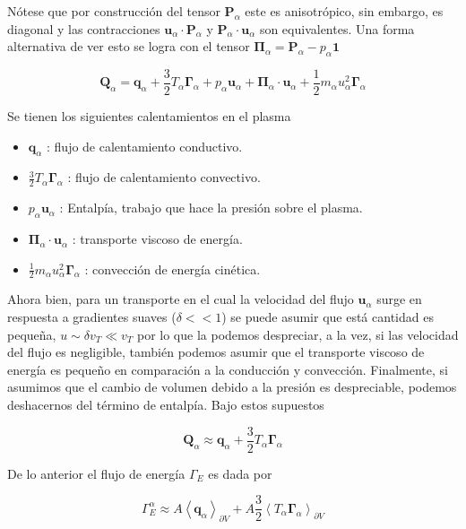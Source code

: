   N\'otese que por construcci\'on del tensor $\textbf{P}_\alpha$ este es anisotr\'opico, sin embargo, es diagonal y las contracciones $\textbf{u}_\alpha\cdot\textbf{P}_\alpha$ y $\textbf{P}_\alpha\cdot\textbf{u}_\alpha$ son equivalentes. Una forma alternativa de ver esto se logra con el tensor $\pmb{\Pi}_\alpha = \textbf{P}_\alpha - p_\alpha\pmb{1}$ 

  \begin{equation}
    \textbf{Q}_\alpha = \textbf{q}_\alpha + \frac{3}{2}T_\alpha\pmb{\Gamma}_\alpha + p_\alpha\textbf{u}_\alpha + \pmb{\Pi}_\alpha\cdot\textbf{u}_\alpha + \frac{1}{2}m_\alpha u_\alpha^2\pmb{\Gamma}_\alpha
  \end{equation}

  Se tienen los siguientes calentamientos en el plasma\cite{helander2005}

  \begin{itemize}
    \item $\textbf{q}_\alpha$ : flujo de calentamiento conductivo.
    \item $\frac{3}{2}T_\alpha\pmb{\Gamma}_\alpha$ : flujo de calentamiento convectivo.
    \item $p_\alpha\textbf{u}_\alpha$ : Entalp\'ia, trabajo que hace la presi\'on sobre el plasma.
    \item $\pmb{\Pi}_\alpha\cdot\textbf{u}_\alpha$ : transporte viscoso de energ\'ia.
    \item $\frac{1}{2}m_\alpha u_\alpha^2\pmb{\Gamma}_\alpha$ : convecci\'on de energ\'ia cin\'etica.
  \end{itemize}

Ahora bien, para un transporte en el cual la velocidad del flujo $\textbf{u}_\alpha$ surge en respuesta a gradientes suaves ($\delta << 1$) se puede asumir que est\'a cantidad es pequeña, $u \sim \delta v_T \ll v_T$ por lo que la podemos despreciar, a la vez, si las velocidad del flujo es negligible, tambi\'en podemos asumir que el transporte viscoso de energ\'ia es pequeño en comparaci\'on a la conducci\'on y convecci\'on. Finalmente, si asumimos que el cambio de volumen debido a la presi\'on es despreciable, podemos deshacernos del t\'ermino de entalp\'ia. Bajo estos supuestos\cite{dinklage2005}

  \begin{equation*}
    \textbf{Q}_\alpha \approx \textbf{q}_\alpha + \frac{3}{2}T_\alpha\pmb{\Gamma}_\alpha
  \end{equation*}

  De lo anterior el flujo de energ\'ia $\Gamma_E$ es dada por 

  \begin{equation}\label{eq:heatfluxp}
  \Gamma_E^\alpha \approx A\left<\textbf{q}_\alpha\right>_{\partial V} + A\frac{3}{2}\left<T_\alpha\pmb{\Gamma}_\alpha\right>_{\partial V}
  \end{equation}
